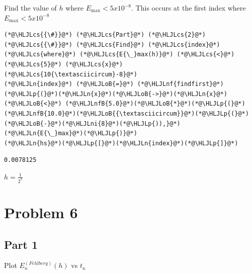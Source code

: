\documentclass[12pt,a4paper]{article}
\newcommand{\HLJLn}[1]{#1}
\newcommand{\HLJLnf}[1]{\textcolor[RGB]{66,102,213}{#1}}
\newcommand{\HLJLnfB}[1]{\textcolor[RGB]{59,151,46}{#1}}
\newcommand{\HLJLni}[1]{\textcolor[RGB]{59,151,46}{#1}}
\newcommand{\HLJLoB}[1]{\textcolor[RGB]{102,102,102}{\textbf{#1}}}
\newcommand{\HLJLp}[1]{#1}
\newcommand{\HLJLcs}[1]{\textcolor[RGB]{153,153,119}{\textit{#1}}}
\begin{document}
Find the value of $h$ where $E_{\max} < 5x10^{-8}$. This occurs at the first index where $E_{\max} < 5x10^{-8}$


\begin{lstlisting}
(*@\HLJLcs{{\#}}@*) (*@\HLJLcs{Part}@*) (*@\HLJLcs{2}@*)
(*@\HLJLcs{{\#}}@*) (*@\HLJLcs{Find}@*) (*@\HLJLcs{index}@*) (*@\HLJLcs{where}@*) (*@\HLJLcs{E{\_}max(h)}@*) (*@\HLJLcs{<}@*) (*@\HLJLcs{5}@*) (*@\HLJLcs{x}@*) (*@\HLJLcs{10{\textasciicircum}-8}@*)
(*@\HLJLn{index}@*) (*@\HLJLoB{=}@*) (*@\HLJLnf{findfirst}@*)(*@\HLJLp{(}@*)(*@\HLJLn{x}@*)(*@\HLJLoB{->}@*)(*@\HLJLn{x}@*) (*@\HLJLoB{<}@*) (*@\HLJLnfB{5.0}@*)(*@\HLJLoB{*}@*)(*@\HLJLp{(}@*)(*@\HLJLnfB{10.0}@*)(*@\HLJLoB{{\textasciicircum}}@*)(*@\HLJLp{(}@*)(*@\HLJLoB{-}@*)(*@\HLJLni{8}@*)(*@\HLJLp{)),}@*) (*@\HLJLn{E{\_}max}@*)(*@\HLJLp{)}@*)
(*@\HLJLn{hs}@*)(*@\HLJLp{[}@*)(*@\HLJLn{index}@*)(*@\HLJLp{]}@*)
\end{lstlisting}

\begin{lstlisting}
0.0078125
\end{lstlisting}


$h = \frac{1}{2^7}$

\section{Problem 6}
\subsection{Part 1}
Plot $E_n^{(Fehlberg)}(h)$ vs $t_n$
\end{document}
